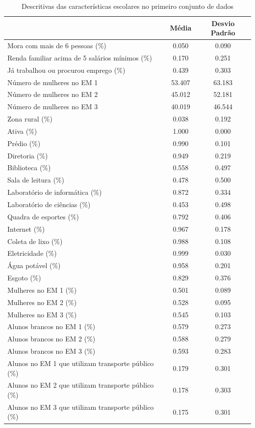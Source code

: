 \begin{table}[H]
  \centering
  \caption{Descritivas das características escolares no primeiro conjunto de dados}
  \label{tab:desc_ice}
  \begin{tabular}{lcc}
  & Média& Desvio Padrão \\
  \hline
  Mora com mais de 6 pessoas (\%) & 0.050 & 0.090 \\
  Renda familiar acima de 5 salários mínimos (\%) & 0.170 & 0.251 \\
  Já trabalhou ou procurou emprego (\%) & 0.439 & 0.303 \\
  Número de mulheres no EM 1 & 53.407 & 63.183 \\
  Número de mulheres no EM 2 & 45.012 & 52.181 \\
  Número de mulheres no EM 3 & 40.019 & 46.544 \\
  Zona rural (\%) & 0.038 & 0.192 \\
  Ativa (\%) & 1.000 & 0.000 \\
  Prédio (\%) & 0.990 & 0.101 \\
  Diretoria (\%) & 0.949 & 0.219 \\
  Biblioteca (\%) & 0.558 & 0.497 \\
  Sala de leitura (\%) & 0.478 & 0.500 \\
  Laboratório de informática (\%) & 0.872 & 0.334 \\
  Laboratório de ciências (\%) & 0.453 & 0.498 \\
  Quadra de esportes (\%) & 0.792 & 0.406 \\
  Internet (\%) & 0.967 & 0.178 \\
  Coleta de lixo (\%) & 0.988 & 0.108 \\
  Eletricidade (\%) & 0.999 & 0.030 \\
  Água potável (\%) & 0.958 & 0.201 \\
  Esgoto (\%) & 0.829 & 0.376 \\
  Mulheres no EM 1 (\%) & 0.501 & 0.089 \\
  Mulheres no EM 2 (\%) & 0.528 & 0.095 \\
  Mulheres no EM 3 (\%) & 0.545 & 0.103 \\
  Alunos brancos no EM 1 (\%) & 0.579 & 0.273 \\
  Alunos brancos no EM 2 (\%) & 0.588 & 0.279 \\
  Alunos brancos no EM 3 (\%) & 0.593 & 0.283 \\
  Alunos no EM 1 que utilizam transporte público (\%) & 0.179 & 0.301 \\
  Alunos no EM 2 que utilizam transporte público (\%) & 0.178 & 0.303 \\
  Alunos no EM 3 que utilizam transporte público (\%) & 0.175 & 0.301 \\\hline
  \end{tabular}
  \end{table}
  

